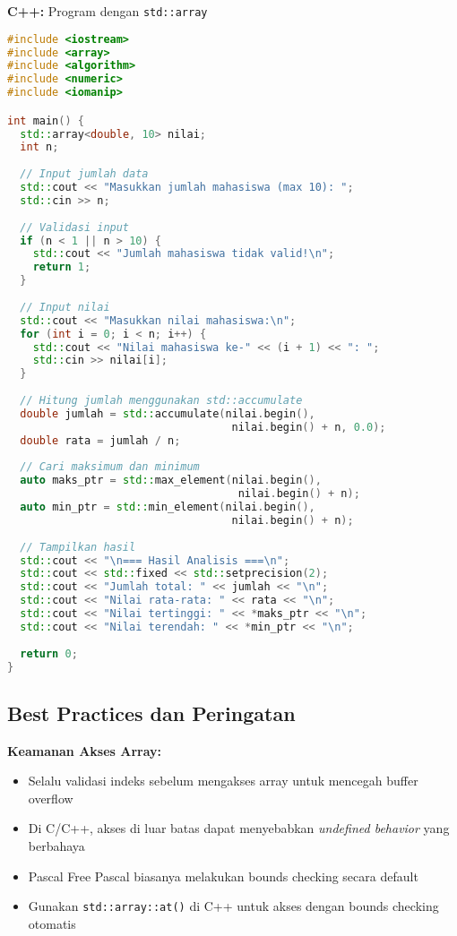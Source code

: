 \documentclass[../main.tex]{subfiles}
\begin{document}
\textbf{C++:} Program dengan \texttt{std::array}
\begin{lstlisting}[language=C++, caption={Program lengkap array 1D di C++}]
#include <iostream>
#include <array>
#include <algorithm>
#include <numeric>
#include <iomanip>

int main() {
  std::array<double, 10> nilai;
  int n;
  
  // Input jumlah data
  std::cout << "Masukkan jumlah mahasiswa (max 10): ";
  std::cin >> n;
  
  // Validasi input
  if (n < 1 || n > 10) {
    std::cout << "Jumlah mahasiswa tidak valid!\n";
    return 1;
  }
  
  // Input nilai
  std::cout << "Masukkan nilai mahasiswa:\n";
  for (int i = 0; i < n; i++) {
    std::cout << "Nilai mahasiswa ke-" << (i + 1) << ": ";
    std::cin >> nilai[i];
  }
  
  // Hitung jumlah menggunakan std::accumulate
  double jumlah = std::accumulate(nilai.begin(), 
                                   nilai.begin() + n, 0.0);
  double rata = jumlah / n;
  
  // Cari maksimum dan minimum
  auto maks_ptr = std::max_element(nilai.begin(), 
                                    nilai.begin() + n);
  auto min_ptr = std::min_element(nilai.begin(), 
                                   nilai.begin() + n);
  
  // Tampilkan hasil
  std::cout << "\n=== Hasil Analisis ===\n";
  std::cout << std::fixed << std::setprecision(2);
  std::cout << "Jumlah total: " << jumlah << "\n";
  std::cout << "Nilai rata-rata: " << rata << "\n";
  std::cout << "Nilai tertinggi: " << *maks_ptr << "\n";
  std::cout << "Nilai terendah: " << *min_ptr << "\n";
  
  return 0;
}
\end{lstlisting}

\subsection{Best Practices dan Peringatan}

\textbf{Keamanan Akses Array:}
\begin{itemize}
  \item Selalu validasi indeks sebelum mengakses array untuk mencegah buffer overflow
  \item Di C/C++, akses di luar batas dapat menyebabkan \textit{undefined behavior} yang berbahaya
  \item Pascal Free Pascal biasanya melakukan bounds checking secara default
  \item Gunakan \texttt{std::array::at()} di C++ untuk akses dengan bounds checking otomatis
\end{itemize}
\end{document}
